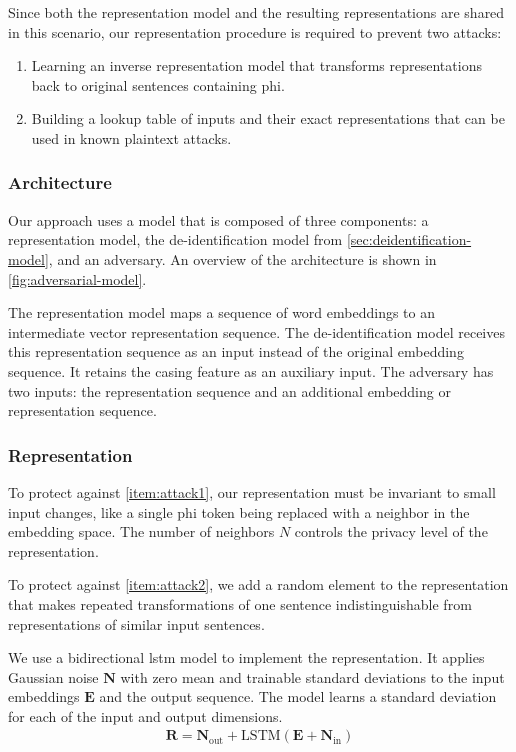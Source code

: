 %
Since both the representation model and the resulting representations are shared in this scenario, our representation procedure is required to prevent two attacks:
%
\begin{enumerate}[label=A\arabic*.,ref=A\arabic*]
    \item Learning an inverse representation model that transforms representations back to original sentences containing \ac{phi}.\label{item:attack1}
    \item Building a lookup table of inputs and their exact representations that can be used in known plaintext attacks.\label{item:attack2}
\end{enumerate}

\subsubsection{Architecture}
%
Our approach uses a model that is composed of three components: a representation model, the de-identification model from \cref{sec:deidentification-model}, and an adversary.
%
An overview of the architecture is shown in \cref{fig:adversarial-model}.

%
The representation model maps a sequence of word embeddings to an intermediate vector representation sequence.
%
The de-identification model receives this representation sequence as an input instead of the original embedding sequence.
%
It retains the casing feature as an auxiliary input.
%
The adversary has two inputs: the representation sequence and an additional embedding or representation sequence.

\subsubsection{Representation}
%
To protect against \ref{item:attack1}, our representation must be invariant to small input changes, like a single \ac{phi} token being replaced with a neighbor in the embedding space.
%
The number of neighbors $N$ controls the privacy level of the representation.

%
To protect against \ref{item:attack2}, we add a random element to the representation that makes repeated transformations of one sentence indistinguishable from representations of similar input sentences.

%
We use a bidirectional \ac{lstm} model to implement the representation.
%
It applies Gaussian noise $\bm{N}$ with zero mean and trainable standard deviations to the input embeddings $\bm{E}$ and the output sequence.
%
The model learns a standard deviation for each of the input and output dimensions.
%
\begin{align}
\bm{R} = \bm{N}_{\text{out}} + \text{LSTM}(\bm{E} + \bm{N}_{\text{in}})
\end{align}

